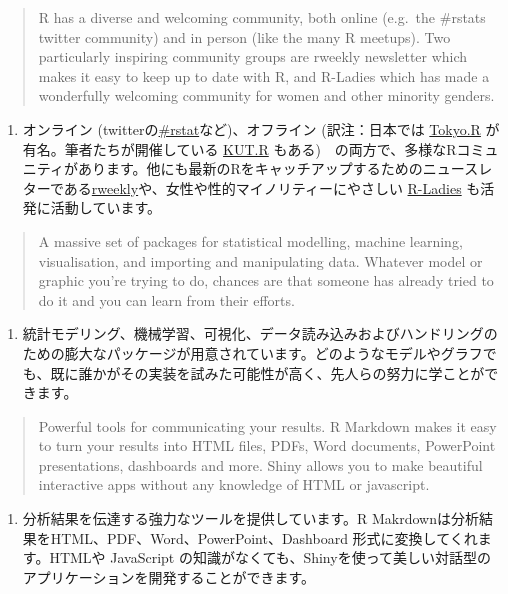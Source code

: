 \documentclass[
  a4paper,
  pandoc,
  ja=standard,
  jafont=haranoaji]{bxjsbook}
\providecommand{\tightlist}{%
  \setlength{\itemsep}{0pt}\setlength{\parskip}{0pt}}
\begin{document}
\begin{quote}
R has a diverse and welcoming community, both online (e.g.~the \#rstats
twitter community) and in person (like the many R meetups). Two
particularly inspiring community groups are rweekly newsletter which
makes it easy to keep up to date with R, and R-Ladies which has made a
wonderfully welcoming community for women and other minority genders.
\end{quote}

\begin{enumerate}
\def\labelenumi{\arabic{enumi}.}
\setcounter{enumi}{1}
\tightlist
\item
  オンライン
  (twitterの\href{https://twitter.com/hashtag/rstat?src=hashtag_click}{\#rstat}など)、オフライン
  (訳注：日本では \href{https://tokyor.connpass.com/}{Tokyo.R}
  が有名。筆者たちが開催している
  \href{https://github.com/yukiyanai/KUT_R}{KUT.R}
  もある)　の両方で、多様なRコミュニティがあります。他にも最新のRをキャッチアップするためのニュースレターである\href{https://rweekly.org/}{rweekly}や、女性や性的マイノリティーにやさしい
  \href{http://r-ladies.org/}{R-Ladies} も活発に活動しています。
\end{enumerate}

\begin{quote}
A massive set of packages for statistical modelling, machine learning,
visualisation, and importing and manipulating data. Whatever model or
graphic you're trying to do, chances are that someone has already tried
to do it and you can learn from their efforts.
\end{quote}

\begin{enumerate}
\def\labelenumi{\arabic{enumi}.}
\setcounter{enumi}{2}
\tightlist
\item
  統計モデリング、機械学習、可視化、データ読み込みおよびハンドリングのための膨大なパッケージが用意されています。どのようなモデルやグラフでも、既に誰かがその実装を試みた可能性が高く、先人らの努力に学ことができます。
\end{enumerate}

\begin{quote}
Powerful tools for communicating your results. R Markdown makes it easy
to turn your results into HTML files, PDFs, Word documents, PowerPoint
presentations, dashboards and more. Shiny allows you to make beautiful
interactive apps without any knowledge of HTML or javascript.
\end{quote}

\begin{enumerate}
\def\labelenumi{\arabic{enumi}.}
\setcounter{enumi}{3}
\tightlist
\item
  分析結果を伝達する強力なツールを提供しています。R
  Makrdownは分析結果をHTML、PDF、Word、PowerPoint、Dashboard
  形式に変換してくれます。HTMLや JavaScript
  の知識がなくても、Shinyを使って美しい対話型のアプリケーションを開発することができます。
\end{enumerate}
\end{document}
